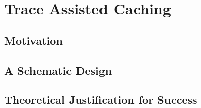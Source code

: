 \chapter{Trace Assisted Caching}
\label{chap:trace-assisted-caching}

\section{Motivation}

\section{A Schematic Design}

\section{Theoretical Justification for Success}